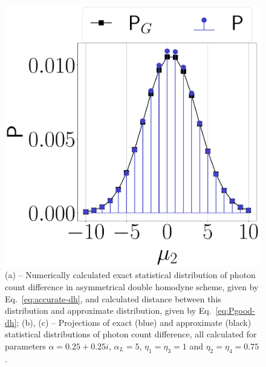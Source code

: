 \begin{figure}
\begin{minipage}[c]{.45\linewidth}
\subcaption[]{}
\end{minipage}
\hfill
        \begin{minipage}[c]{.45\linewidth}
 \includegraphics[width=\linewidth]{pics/double-homodyne/dm2.pdf}
\subcaption[]{}
\end{minipage}
    \caption{(a) -- 
     Numerically calculated exact statistical distribution of photon count difference in asymmetrical double homodyne scheme, given by  Eq.~\eqref{eq:accurate-dh}, and calculated distance between this distribution and approximate distribution, given by Eq.~\eqref{eq:Pgood-dh}; (b), (c) -- Projections of exact (blue) and approximate (black) statistical distributions of photon count difference, all calculated for parameters $\alpha=0.25+0.25i$, $\alpha_L=5$, $\eta_1=\eta_3=1$ and $\eta_2=\eta_4=0.75$.
    }\label{fig:dh-statistics}
\end{figure}